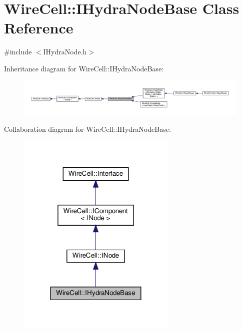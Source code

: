 \hypertarget{class_wire_cell_1_1_i_hydra_node_base}{}\section{Wire\+Cell\+:\+:I\+Hydra\+Node\+Base Class Reference}
\label{class_wire_cell_1_1_i_hydra_node_base}


{\ttfamily \#include $<$I\+Hydra\+Node.\+h$>$}



Inheritance diagram for Wire\+Cell\+:\+:I\+Hydra\+Node\+Base\+:
\nopagebreak
\begin{figure}[H]
\begin{center}
\leavevmode
\includegraphics[width=350pt]{class_wire_cell_1_1_i_hydra_node_base__inherit__graph}
\end{center}
\end{figure}


Collaboration diagram for Wire\+Cell\+:\+:I\+Hydra\+Node\+Base\+:
\nopagebreak
\begin{figure}[H]
\begin{center}
\leavevmode
\includegraphics[width=215pt]{class_wire_cell_1_1_i_hydra_node_base__coll__graph}
\end{center}
\end{figure}
